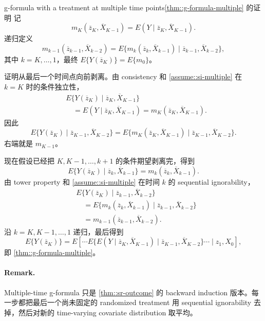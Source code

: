 \begin{exercisesolution}{g-formula with a treatment at multiple time points}{\cref{thm::g-formula-multiple} 的证明}
记
\[
m_K(\overline z_K,\overline X_{K-1})
=E(Y\mid \overline z_K,\overline X_{K-1}).
\]
递归定义
\[
m_{k-1}(\overline z_{k-1},\overline X_{k-2})
=
E\{m_k(\overline z_k,\overline X_{k-1})
\mid \overline z_{k-1},\overline X_{k-2}\},
\]
其中 $k=K,\ldots,1$，最终 $E\{Y(\overline z_K)\}=E\{m_0\}$。

证明从最后一个时间点向前剥离。由 consistency 和 \cref{assume::si-multiple} 在 $k=K$ 时的条件独立性，
\begin{align*}
&E\{Y(\overline z_K)\mid \overline z_K,\overline X_{K-1}\}\\
&\quad =
E(Y\mid \overline z_K,\overline X_{K-1})
=m_K(\overline z_K,\overline X_{K-1}).
\end{align*}
因此
\[
E\{Y(\overline z_K)\mid \overline z_{K-1},\overline X_{K-2}\}
=
E\{m_K(\overline z_K,\overline X_{K-1})
\mid \overline z_{K-1},\overline X_{K-2}\}.
\]
右端就是 $m_{K-1}$。

现在假设已经把 $K,K-1,\ldots,k+1$ 的条件期望剥离完，得到
\[
E\{Y(\overline z_K)\mid \overline z_k,\overline X_{k-1}\}
=m_k(\overline z_k,\overline X_{k-1}).
\]
由 tower property 和 \cref{assume::si-multiple} 在时间 $k$ 的 sequential ignorability，
\begin{align*}
&E\{Y(\overline z_K)\mid \overline z_{k-1},\overline X_{k-2}\}\\
&\quad =
E\{m_k(\overline z_k,\overline X_{k-1})
\mid \overline z_{k-1},\overline X_{k-2}\}\\
&\quad =m_{k-1}(\overline z_{k-1},\overline X_{k-2}).
\end{align*}
沿 $k=K,K-1,\ldots,1$ 递归，最后得到
\[
E\{Y(\overline z_K)\}
=
E\left[ \cdots
E\{E(Y\mid \overline z_K,\overline X_{K-1})
\mid \overline z_{K-1},\overline X_{K-2}\}
\cdots \mid z_1,X_0
\right],
\]
即 \cref{thm::g-formula-multiple}。

\paragraph{Remark.}
Multiple-time g-formula 只是 \cref{thm::sr-outcome} 的 backward induction 版本。每一步都把最后一个尚未固定的 randomized treatment 用 sequential ignorability 去掉，然后对新的 time-varying covariate distribution 取平均。
\end{exercisesolution}

